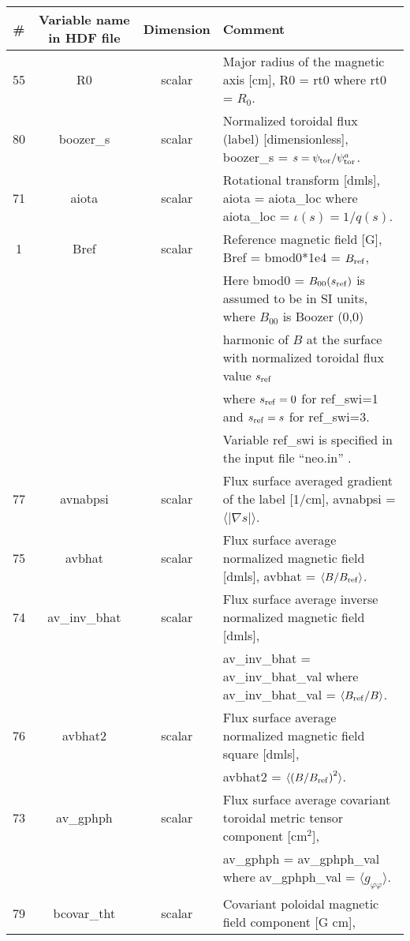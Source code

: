\documentclass[preprint,prb,aps]{revtex4-1}
\begin{document}
\begin{table}[h]
\begin{tabular}{|c|c|c|l|}
\hline
\hline
\# & Variable name in HDF file & Dimension  & Comment \\
\hline
\hline
55 & R0 & scalar & Major radius of the magnetic axis [cm],
R0 = rt0 where rt0 = $R_0$.
\\
\hline
80 & boozer\_s & scalar & Normalized toroidal flux (label) [dimensionless],
boozer\_s = $s = \psi_{\rm tor}/\psi^a_{\rm tor}$.
\\
\hline
71 & aiota & scalar & Rotational transform [dmls], aiota = aiota\_loc where
aiota\_loc = $\iota(s)=1/q(s)$.
\\
\hline
%
1 & Bref & scalar & Reference magnetic field [G], Bref = bmod0*1e4 = $B_{\rm ref}$, \\
 & & & Here bmod0 = $B_{00}(s_{\rm ref})$ is assumed to be in SI units, where $B_{00}$ is Boozer (0,0)\\
 & & & harmonic of $B$ at the surface with normalized toroidal flux value $s_{\rm ref}$\\
 & & & where $s_{\rm ref}=0$ for ref\_swi=1 and $s_{\rm ref}=s$ for ref\_swi=3. \\
 & & & Variable ref\_swi is specified in the input file ``neo.in'' .
\\
\hline
77 & avnabpsi & scalar &
Flux surface averaged gradient of the label [1/cm],
avnabpsi = $\langle |\nabla s| \rangle$.
\\
\hline
75 & avbhat & scalar &
Flux surface average normalized magnetic field [dmls],
avbhat = $\langle B / B_{\rm ref}\rangle$.
\\
\hline
74 & av\_inv\_bhat & scalar & Flux surface average inverse normalized magnetic field [dmls],
\\
 & & &
av\_inv\_bhat = av\_inv\_bhat\_val where av\_inv\_bhat\_val = $\langle B_{\rm ref}/B\rangle$.
\\
\hline
76 & avbhat2 & scalar &
Flux surface average normalized magnetic field square [dmls],
\\
 & & &
avbhat2  = $\langle \left(B / B_{\rm ref}\right)^2\rangle$.
\\
\hline
73 & av\_gphph & scalar &
Flux surface average covariant toroidal metric tensor component [cm$^2$],
\\
 & & &
av\_gphph = av\_gphph\_val where av\_gphph\_val = $\langle g_{\varphi\varphi}\rangle$.
\\
\hline
79 & bcovar\_tht & scalar & Covariant poloidal magnetic field component [G cm],

\end{tabular}
\end{table}
\end{document}

